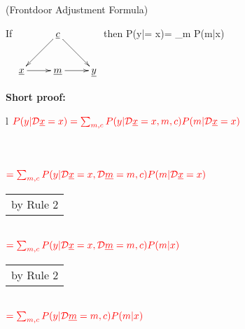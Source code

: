 \begin{claim} (Frontdoor
Adjustment Formula)
\label{cl-frontdoor-proof}

If
$
\xymatrix{
&{\rvc}\ar[ld]\ar[rd]
\\
\rvx\ar[r]&\rvm\ar[r]&\rvy
}$
then
\beq
P(y|\cald \rvx = x)=
\sum_m
P(m|x)
\eeq

\beq
{}
\eeq
\end{claim}

\proof


{\bf * Short proof:}
\\
\begin{longtable}{l}
$\color{red}
P(y|{\cal D}{\underline{x}}=x)=
\sum_{m,c}
P(y|{\cal D}{\underline{x}}=x, m, c)
P(m|{\cal D}{\underline{x}}=x)$
\\
\\
\xymatrix{\\=}
\\
\\
$\color{red}=
\sum_{m,c}
P(y|{\cal D}{\underline{x}}=x, {\cal D}{\underline{m}}=m, c)
P(m|{\cal D}{\underline{x}}=x)$
\\
\begin{tabular}{l}
\\
by Rule 2
\end{tabular}
\\
$\color{red}=
\sum_{m,c}
P(y|{\cal D}{\underline{x}}=x, {\cal D}{\underline{m}}=m, c)
P(m| x)$
\\
\begin{tabular}{l}
\\
by Rule 2
\end{tabular}
\\
$\color{red}=
\sum_{m,c}
P(y|{\cal D}{\underline{m}}=m, c)
P(m|x)$
\\

\end{longtable}
